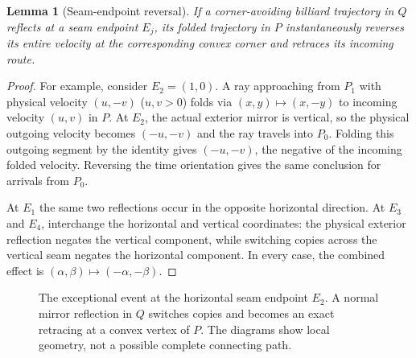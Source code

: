 \documentclass[11pt]{article}
\newtheorem{lemma}{Lemma}
\theoremstyle{remark}
\begin{document}
\begin{lemma}[Seam-endpoint reversal]\label{lem:reversal}
If a corner-avoiding billiard trajectory in $Q$ reflects at a seam endpoint $E_j$, its folded trajectory in $P$ instantaneously \emph{reverses its entire velocity} at the corresponding convex corner and retraces its incoming route.
\end{lemma}
\begin{proof}
For example, consider $E_2=(1,0)$. A ray approaching from $P_1$ with physical velocity $(u,-v)$ ($u,v>0$) folds via $(x,y)\mapsto(x,-y)$ to incoming velocity $(u,v)$ in $P$. At $E_2$, the actual exterior mirror is vertical, so the physical outgoing velocity becomes $(-u,-v)$ and the ray travels into $P_0$. Folding this outgoing segment by the identity gives $(-u,-v)$, the negative of the incoming folded velocity. Reversing the time orientation gives the same conclusion for arrivals from $P_0$.

At $E_1$ the same two reflections occur in the opposite horizontal direction. At $E_3$ and $E_4$, interchange the horizontal and vertical coordinates: the physical exterior reflection negates the vertical component, while switching copies across the vertical seam negates the horizontal component. In every case, the combined effect is $(\alpha,\beta)\mapsto(-\alpha,-\beta)$.
\end{proof}

\begin{figure}[htbp]
\centering
{}
\caption{The exceptional event at the horizontal seam endpoint $E_2$. A normal mirror reflection in $Q$ switches copies and becomes an exact retracing at a convex vertex of $P$. The diagrams show local geometry, not a possible complete connecting path.}\label{fig:reverse}
\end{figure}
\end{document}
